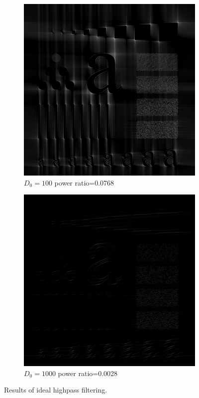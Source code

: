 \begin{figure}[h!]
\begin{subfigure}[b]{0.3\linewidth}
		\includegraphics[width=\linewidth]{myfigure/p3/IHPF_100.png}
		\caption{$D_0=100$ power ratio=0.0768}
		\label{fig:IHPF_100}
	\end{subfigure}
	\begin{subfigure}[b]{0.3\linewidth}
		\includegraphics[width=\linewidth]{myfigure/p3/IHPF_1000.png}
		\caption{$D_0=1000$ power ratio=0.0028}
		\label{fig:IHPF_1000}
	\end{subfigure}
  	\caption{Results of ideal highpass filtering.}
  	\label{fig:IHPF}
\end{figure}

